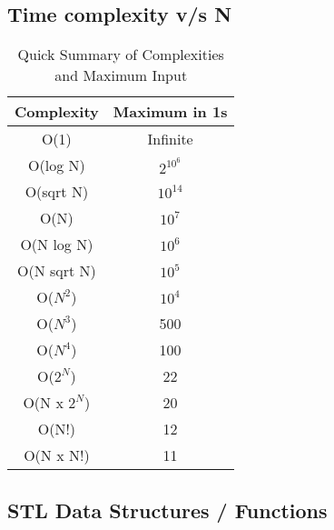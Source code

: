 \documentclass{article}
\begin{document}
\subsection{Time complexity v/s N}
\begin{table}[H]
\begin{tabular}{|c|c|}
\hline
Complexity     & Maximum in 1s \\ \hline
O(1)           & Infinite      \\ \hline
O(log N)       & $2^{10^{6}}$  \\ \hline
O(sqrt N)      & $10^{14}$     \\ \hline
O(N)           & $10^{7}$      \\ \hline
O(N log N)     & $10^{6}$      \\ \hline
O(N sqrt N)    & $10^{5}$      \\ \hline
O($N^{2}$)     & $10^{4}$      \\ \hline
O($N^{3}$)     & 500           \\ \hline
O($N^{4}$)     & 100           \\ \hline
O($2^{N}$)     & 22            \\ \hline
O(N x $2^{N}$) & 20            \\ \hline
O(N!)          & 12            \\ \hline
O(N x N!)      & 11            \\ \hline
\end{tabular}
\caption{Quick Summary of Complexities and Maximum Input}
\label{tab:complexity}
\end{table}

\subsection{STL Data Structures / Functions}

\end{document}
